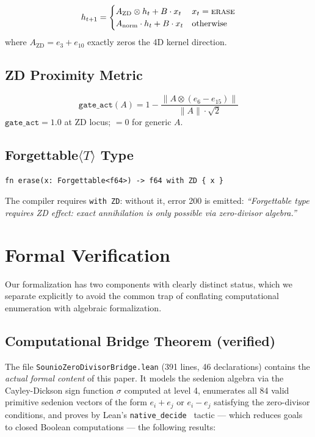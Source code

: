 \documentclass{article}
\newcommand{\ZD}{\mathrm{ZD}}
\begin{document}
\begin{equation}
  h_{t+1} =
  \begin{cases}
    A_{\ZD} \otimes h_t + B \cdot x_t & x_t = \textsc{erase} \\
    A_{\mathrm{norm}} \cdot h_t + B \cdot x_t & \text{otherwise}
  \end{cases}
\end{equation}
where $A_{\ZD} = e_3 + e_{10}$ exactly zeros the 4D kernel direction.

\subsection{ZD Proximity Metric}

\begin{equation}
  \mathtt{gate\_act}(A) = 1 - \frac{\|A \otimes (e_6 - e_{15})\|}{\|A\| \cdot \sqrt{2}}
\end{equation}
$\mathtt{gate\_act} = 1.0$ at ZD locus; $= 0$ for generic $A$.

\subsection{Forgettable$\langle T\rangle$ Type}

\begin{lstlisting}[basicstyle=\small\ttfamily]
fn erase(x: Forgettable<f64>) -> f64 with ZD { x }
\end{lstlisting}
The compiler requires \texttt{with ZD}: without it, error 200 is emitted:
\textit{``Forgettable type requires ZD effect: exact annihilation is only
possible via zero-divisor algebra.''}

\section{Formal Verification}
\label{sec:formal}

Our formalization has two components with clearly distinct status, which we
separate explicitly to avoid the common trap of conflating computational
enumeration with algebraic formalization.

\subsection{Computational Bridge Theorem (verified)}
\label{sec:bridge-verified}

The file \texttt{SounioZeroDivisorBridge.lean} (391 lines, 46 declarations)
contains the \emph{actual formal content} of this paper. It models the sedenion
algebra via the Cayley-Dickson sign function $\sigma$ computed at level 4, enumerates
all 84 valid primitive sedenion vectors of the form $e_i + e_j$ or $e_i - e_j$
satisfying the zero-divisor conditions, and proves by Lean's
\texttt{native\_decide}~\cite{demoura2021lean4} tactic --- which reduces goals to
closed Boolean computations --- the following results:
\end{document}
